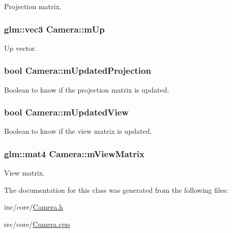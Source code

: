 Projection matrix. 

\hypertarget{class_camera_aeb654bbaf5de5e39222fad748b1bee33}{
\subsubsection[{m\+Up}]{\setlength{\rightskip}{0pt plus 5cm}glm\+::vec3 Camera\+::m\+Up\hspace{0.3cm}{\ttfamily [protected]}}}\label{class_camera_aeb654bbaf5de5e39222fad748b1bee33}


Up vector. 

\hypertarget{class_camera_a8c5b9764b6d3799ee7ff0f8fe219686e}{
\subsubsection[{m\+Updated\+Projection}]{\setlength{\rightskip}{0pt plus 5cm}bool Camera\+::m\+Updated\+Projection\hspace{0.3cm}{\ttfamily [protected]}}}\label{class_camera_a8c5b9764b6d3799ee7ff0f8fe219686e}


Boolean to know if the projection matrix is updated. 

\hypertarget{class_camera_a814cf74a3cbe197060fc5dfef0d16d30}{
\subsubsection[{m\+Updated\+View}]{\setlength{\rightskip}{0pt plus 5cm}bool Camera\+::m\+Updated\+View\hspace{0.3cm}{\ttfamily [protected]}}}\label{class_camera_a814cf74a3cbe197060fc5dfef0d16d30}


Boolean to know if the view matrix is updated. 

\hypertarget{class_camera_af3e5e12c45763fae6cbeaa24702bfa82}{
\subsubsection[{m\+View\+Matrix}]{\setlength{\rightskip}{0pt plus 5cm}glm\+::mat4 Camera\+::m\+View\+Matrix\hspace{0.3cm}{\ttfamily [protected]}}}\label{class_camera_af3e5e12c45763fae6cbeaa24702bfa82}


View matrix. 



The documentation for this class was generated from the following files\+:\begin{DoxyCompactItemize}
\item 
inc/core/\hyperlink{_camera_8h}{Camera.\+h}\item 
src/core/\hyperlink{_camera_8cpp}{Camera.\+cpp}\end{DoxyCompactItemize}
